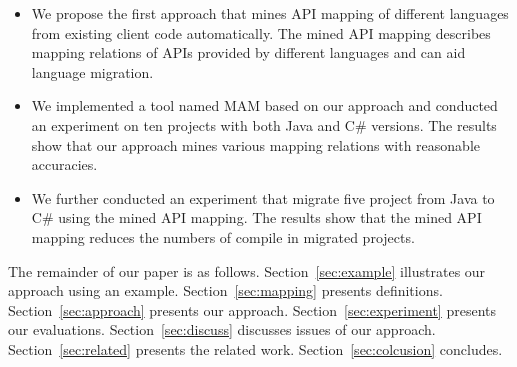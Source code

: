 \begin{itemize}\vspace*{-1.5ex}
\item We propose the first approach that mines API mapping of
different languages from existing client code automatically. The
mined API mapping describes mapping relations of APIs provided by
different languages and can aid language migration.\vspace*{-1.5ex}
\item We
implemented a tool named MAM based on our approach and conducted an
experiment on ten projects with both Java and C\# versions. The
results show that our approach mines various mapping relations with
reasonable accuracies. \vspace*{-1.5ex}
\item We further conducted an experiment that migrate five project
from Java to C\# using the mined API mapping. The results show that
the mined API mapping reduces the numbers of compile in migrated
projects.
\end{itemize}\vspace*{-1.5ex}


The remainder of our paper is as follows. Section~\ref{sec:example}
illustrates our approach using an example. Section~\ref{sec:mapping}
presents definitions. Section~\ref{sec:approach} presents our
approach. Section~\ref{sec:experiment} presents our evaluations.
Section~\ref{sec:discuss} discusses issues of our approach.
Section~\ref{sec:related} presents the related work.
Section~\ref{sec:colcusion} concludes.
